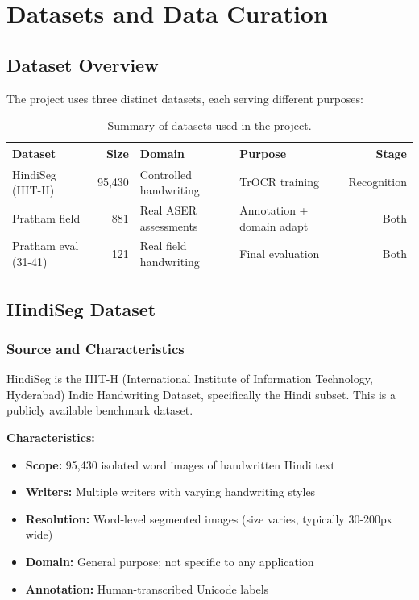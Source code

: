 \documentclass[14pt,a4paper]{article}
\begin{document}
\section{Datasets and Data Curation}

\subsection{Dataset Overview}

The project uses three distinct datasets, each serving different purposes:

\begin{table}[h]
    \centering
    \begin{tabular}{lrllr}
        \toprule
        \textbf{Dataset} & \textbf{Size} & \textbf{Domain} & \textbf{Purpose} & \textbf{Stage} \\
        \midrule
        HindiSeg (IIIT-H) & 95,430 & Controlled handwriting & TrOCR training & Recognition \\
        Pratham field & 881 & Real ASER assessments & Annotation + domain adapt & Both \\
        Pratham eval (31-41) & 121 & Real field handwriting & Final evaluation & Both \\
        \bottomrule
    \end{tabular}
    \caption{Summary of datasets used in the project.}
\end{table}

\subsection{HindiSeg Dataset}

\subsubsection{Source and Characteristics}

HindiSeg is the IIIT-H (International Institute of Information Technology, Hyderabad) Indic Handwriting Dataset, specifically the Hindi subset. This is a publicly available benchmark dataset.

\textbf{Characteristics:}
\begin{itemize}
    \item \textbf{Scope:} 95,430 isolated word images of handwritten Hindi text
    \item \textbf{Writers:} Multiple writers with varying handwriting styles
    \item \textbf{Resolution:} Word-level segmented images (size varies, typically 30-200px wide)
    \item \textbf{Domain:} General purpose; not specific to any application
    \item \textbf{Annotation:} Human-transcribed Unicode labels
\end{itemize}
\end{document}
